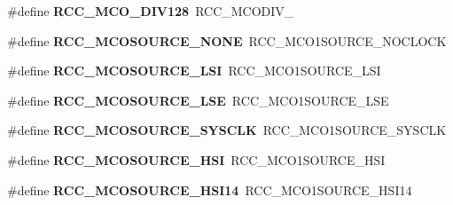 \begin{DoxyCompactItemize}
\item 
\hypertarget{group___h_a_l___r_c_c___aliased_ga13db6fb3b4264a8fff9f671faf393f1b}{\#define {\bfseries R\-C\-C\-\_\-\-M\-C\-O\-\_\-\-D\-I\-V128}~R\-C\-C\-\_\-\-M\-C\-O\-D\-I\-V\-\_}\label{group___h_a_l___r_c_c___aliased_ga13db6fb3b4264a8fff9f671faf393f1b}

\item 
\hypertarget{group___h_a_l___r_c_c___aliased_ga55362c6bb39a405d997b64cf8db9709e}{\#define {\bfseries R\-C\-C\-\_\-\-M\-C\-O\-S\-O\-U\-R\-C\-E\-\_\-\-N\-O\-N\-E}~R\-C\-C\-\_\-\-M\-C\-O1\-S\-O\-U\-R\-C\-E\-\_\-\-N\-O\-C\-L\-O\-C\-K}\label{group___h_a_l___r_c_c___aliased_ga55362c6bb39a405d997b64cf8db9709e}

\item 
\hypertarget{group___h_a_l___r_c_c___aliased_ga71ac33c61f4246489cc1c34bebe9b45d}{\#define {\bfseries R\-C\-C\-\_\-\-M\-C\-O\-S\-O\-U\-R\-C\-E\-\_\-\-L\-S\-I}~R\-C\-C\-\_\-\-M\-C\-O1\-S\-O\-U\-R\-C\-E\-\_\-\-L\-S\-I}\label{group___h_a_l___r_c_c___aliased_ga71ac33c61f4246489cc1c34bebe9b45d}

\item 
\hypertarget{group___h_a_l___r_c_c___aliased_ga830cfeba85393f5a5a2743ad0f373834}{\#define {\bfseries R\-C\-C\-\_\-\-M\-C\-O\-S\-O\-U\-R\-C\-E\-\_\-\-L\-S\-E}~R\-C\-C\-\_\-\-M\-C\-O1\-S\-O\-U\-R\-C\-E\-\_\-\-L\-S\-E}\label{group___h_a_l___r_c_c___aliased_ga830cfeba85393f5a5a2743ad0f373834}

\item 
\hypertarget{group___h_a_l___r_c_c___aliased_ga250215c0f82d63c001f1a19f6baeaee4}{\#define {\bfseries R\-C\-C\-\_\-\-M\-C\-O\-S\-O\-U\-R\-C\-E\-\_\-\-S\-Y\-S\-C\-L\-K}~R\-C\-C\-\_\-\-M\-C\-O1\-S\-O\-U\-R\-C\-E\-\_\-\-S\-Y\-S\-C\-L\-K}\label{group___h_a_l___r_c_c___aliased_ga250215c0f82d63c001f1a19f6baeaee4}

\item 
\hypertarget{group___h_a_l___r_c_c___aliased_gaf76c21fc91d02a5006b1ad20bb09fb59}{\#define {\bfseries R\-C\-C\-\_\-\-M\-C\-O\-S\-O\-U\-R\-C\-E\-\_\-\-H\-S\-I}~R\-C\-C\-\_\-\-M\-C\-O1\-S\-O\-U\-R\-C\-E\-\_\-\-H\-S\-I}\label{group___h_a_l___r_c_c___aliased_gaf76c21fc91d02a5006b1ad20bb09fb59}

\item 
\hypertarget{group___h_a_l___r_c_c___aliased_gaf44dc4cc77e850c96fc1fee93a74a838}{\#define {\bfseries R\-C\-C\-\_\-\-M\-C\-O\-S\-O\-U\-R\-C\-E\-\_\-\-H\-S\-I14}~R\-C\-C\-\_\-\-M\-C\-O1\-S\-O\-U\-R\-C\-E\-\_\-\-H\-S\-I14}\label{group___h_a_l___r_c_c___aliased_gaf44dc4cc77e850c96fc1fee93a74a838}


\end{DoxyCompactItemize}
